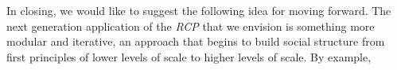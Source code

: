 \documentclass{article}
\begin{document}
In closing, we would like to suggest the following idea for moving forward.  The next generation application of the \textit{RCP} that we envision is something more modular and iterative, an approach that begins to build social structure from first principles of lower levels of scale to higher levels of scale.  By example, 








\end{document}

